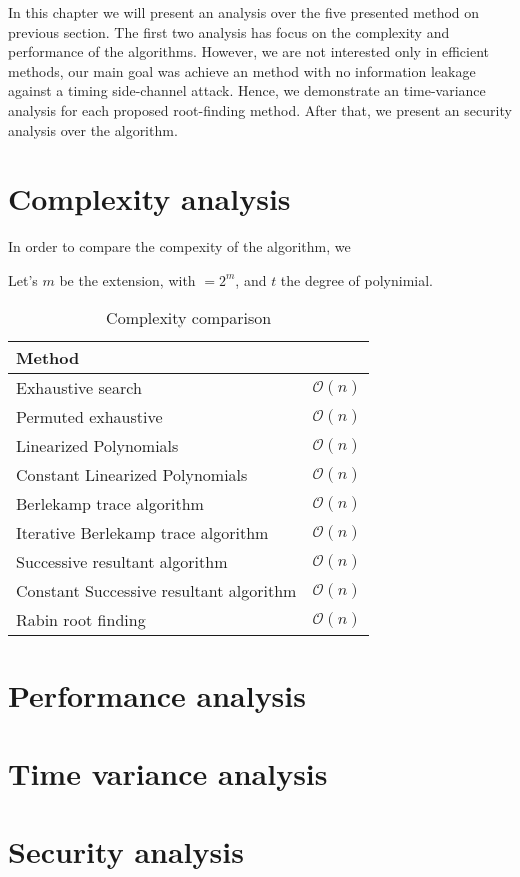 In this chapter we will present an analysis over the five presented method on previous section. The first two analysis has focus on the complexity and performance of the algorithms. However, we are not interested only in efficient methods, our main goal was achieve an method with no information leakage against a timing side-channel attack. Hence, we demonstrate an time-variance analysis for each proposed root-finding method. After that, we present an security analysis over the algorithm.

\section{Complexity analysis}
In order to compare the compexity of the algorithm, we 

Let's $m$ be the extension, with $ = 2^m$, and $t$ the degree of polynimial.


\begin{table}[ht]
\centering
\label{tab:complexity}
\caption{Complexity comparison}
\begin{tabular}{ll}
Method                                  &                \\ \hline
Exhaustive search                       & $\mathcal{O}(n)$ \\
Permuted exhaustive                     & $\mathcal{O}(n)$ \\
Linearized Polynomials                  & $\mathcal{O}(n)$ \\
Constant Linearized Polynomials         & $\mathcal{O}(n)$ \\
Berlekamp trace algorithm               & $\mathcal{O}(n)$ \\
Iterative Berlekamp trace algorithm     & $\mathcal{O}(n)$ \\
Successive resultant algorithm          & $\mathcal{O}(n)$ \\
Constant Successive resultant algorithm & $\mathcal{O}(n)$ \\
Rabin root finding                      & $\mathcal{O}(n)$
\end{tabular}
\end{table}



\section{Performance analysis}
\section{Time variance analysis}
\section{Security analysis}
